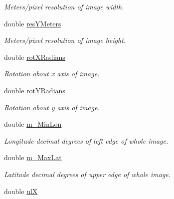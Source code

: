\begin{DoxyCompactItemize}
\begin{DoxyCompactList}\small\item\em Meters/pixel resolution of image width. \end{DoxyCompactList}\item 
\hypertarget{class_geomap3_d_af1bf107adae1c2abea9784eec8e2acf6}{
double \hyperlink{class_geomap3_d_af1bf107adae1c2abea9784eec8e2acf6}{resYMeters}}
\label{class_geomap3_d_af1bf107adae1c2abea9784eec8e2acf6}

\begin{DoxyCompactList}\small\item\em Meters/pixel resolution of image height. \end{DoxyCompactList}\item 
\hypertarget{class_geomap3_d_a854d8be7d39fe6950fb299031a7cd7c9}{
double \hyperlink{class_geomap3_d_a854d8be7d39fe6950fb299031a7cd7c9}{rotXRadians}}
\label{class_geomap3_d_a854d8be7d39fe6950fb299031a7cd7c9}

\begin{DoxyCompactList}\small\item\em Rotation about x axis of image. \end{DoxyCompactList}\item 
\hypertarget{class_geomap3_d_ac15780d65a0e92dec0191d564273986a}{
double \hyperlink{class_geomap3_d_ac15780d65a0e92dec0191d564273986a}{rotYRadians}}
\label{class_geomap3_d_ac15780d65a0e92dec0191d564273986a}

\begin{DoxyCompactList}\small\item\em Rotation about y axis of image. \end{DoxyCompactList}\item 
\hypertarget{class_geomap3_d_a733ab983a0de120b6e082f634c199de5}{
double \hyperlink{class_geomap3_d_a733ab983a0de120b6e082f634c199de5}{m\_\-MinLon}}
\label{class_geomap3_d_a733ab983a0de120b6e082f634c199de5}

\begin{DoxyCompactList}\small\item\em Longitude decimal degrees of left edge of whole image. \end{DoxyCompactList}\item 
\hypertarget{class_geomap3_d_a7750ad8250d5b0ddf2aa9fcba99ac198}{
double \hyperlink{class_geomap3_d_a7750ad8250d5b0ddf2aa9fcba99ac198}{m\_\-MaxLat}}
\label{class_geomap3_d_a7750ad8250d5b0ddf2aa9fcba99ac198}

\begin{DoxyCompactList}\small\item\em Latitude decimal degrees of upper edge of whole image. \end{DoxyCompactList}\item 
\hypertarget{class_geomap3_d_a0d5cabf88eb777c32fb952d0da088aa5}{
double \hyperlink{class_geomap3_d_a0d5cabf88eb777c32fb952d0da088aa5}{ulX}}
\label{class_geomap3_d_a0d5cabf88eb777c32fb952d0da088aa5}


\end{DoxyCompactItemize}
